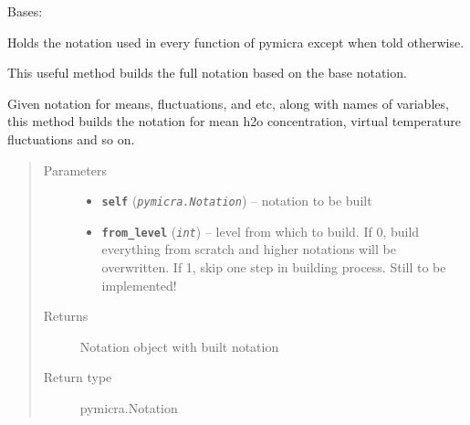 \documentclass[a4paper,10pt,oneside]{sphinxmanual}
\begin{document}
\begin{fulllineitems}
\label{pymicra:pymicra.core.Notation}
Bases: 

Holds the notation used in every function of pymicra except when told otherwise.

\begin{fulllineitems}
\label{pymicra:pymicra.core.Notation.build}
This useful method builds the full notation based on the base notation.

Given notation for means, fluctuations, and etc, along with names of variables, this
method builds the notation for mean h2o concentration, virtual temperature fluctuations
and so on.
\begin{quote}\begin{description}
\item[{Parameters}] \leavevmode\begin{itemize}
\item {} 
\textbf{\texttt{self}} (\emph{\texttt{pymicra.Notation}}) -- notation to be built

\item {} 
\textbf{\texttt{from\_level}} (\emph{\texttt{int}}) -- level from which to build. If 0, build everything from scratch and higher notations
will be overwritten. If 1, skip one step in building process. Still to be implemented!

\end{itemize}

\item[{Returns}] \leavevmode
Notation object with built notation

\item[{Return type}] \leavevmode
pymicra.Notation

\end{description}\end{quote}

\end{fulllineitems}


\end{fulllineitems}

\end{document}
